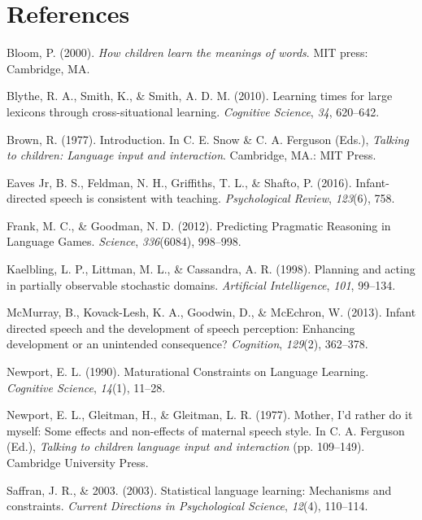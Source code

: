 \documentclass[10pt, letterpaper]{article}
\begin{document}
\section{References}\label{references}

\setlength{\parindent}{-0.1in} \setlength{\leftskip}{0.125in} \noindent

\hypertarget{refs}{}
\hypertarget{ref-bloom2000}{}
Bloom, P. (2000). \emph{How children learn the meanings of words}. MIT
press: Cambridge, MA.

\hypertarget{ref-blythe2010}{}
Blythe, R. A., Smith, K., \& Smith, A. D. M. (2010). Learning times for
large lexicons through cross-situational learning. \emph{Cognitive
Science}, \emph{34}, 620--642.

\hypertarget{ref-brown1977}{}
Brown, R. (1977). Introduction. In C. E. Snow \& C. A. Ferguson (Eds.),
\emph{Talking to children: Language input and interaction}. Cambridge,
MA.: MIT Press.

\hypertarget{ref-eaves-jr2016}{}
Eaves Jr, B. S., Feldman, N. H., Griffiths, T. L., \& Shafto, P. (2016).
Infant-directed speech is consistent with teaching. \emph{Psychological
Review}, \emph{123}(6), 758.

\hypertarget{ref-frank2012}{}
Frank, M. C., \& Goodman, N. D. (2012). Predicting Pragmatic Reasoning
in Language Games. \emph{Science}, \emph{336}(6084), 998--998.

\hypertarget{ref-kaelbling1998}{}
Kaelbling, L. P., Littman, M. L., \& Cassandra, A. R. (1998). Planning
and acting in partially observable stochastic domains. \emph{Artificial
Intelligence}, \emph{101}, 99--134.

\hypertarget{ref-mcmurray2013}{}
McMurray, B., Kovack-Lesh, K. A., Goodwin, D., \& McEchron, W. (2013).
Infant directed speech and the development of speech perception:
Enhancing development or an unintended consequence? \emph{Cognition},
\emph{129}(2), 362--378.

\hypertarget{ref-newport1990}{}
Newport, E. L. (1990). Maturational Constraints on Language Learning.
\emph{Cognitive Science}, \emph{14}(1), 11--28.

\hypertarget{ref-newport1977}{}
Newport, E. L., Gleitman, H., \& Gleitman, L. R. (1977). Mother, I'd
rather do it myself: Some effects and non-effects of maternal speech
style. In C. A. Ferguson (Ed.), \emph{Talking to children language input
and interaction} (pp. 109--149). Cambridge University Press.

\hypertarget{ref-saffran2003}{}
Saffran, J. R., \& 2003. (2003). Statistical language learning:
Mechanisms and constraints. \emph{Current Directions in Psychological
Science}, \emph{12}(4), 110--114.
\end{document}
